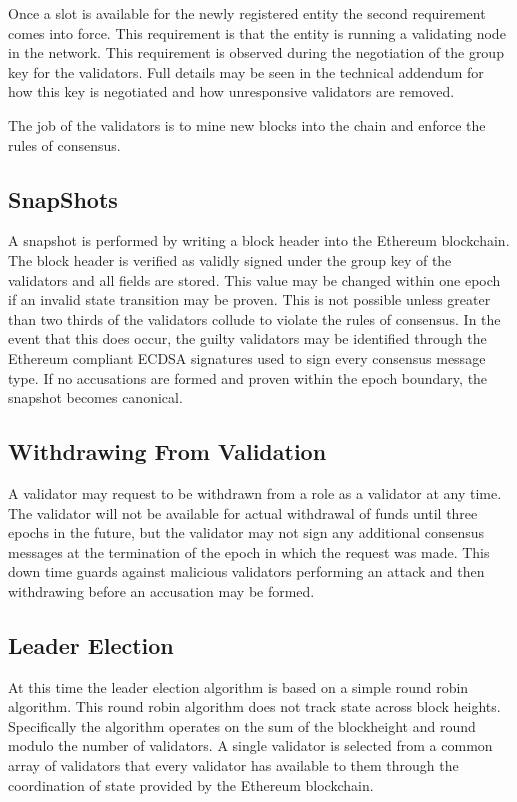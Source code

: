 Once a slot is available for the newly registered entity the second
requirement comes into force.
This requirement is that the entity is running a validating node in the
network.
This requirement is observed during the negotiation of the group key
for the validators.
Full details may be seen in the technical addendum for how this key is
negotiated and how unresponsive validators are removed.

The job of the validators is to mine new blocks into the chain and
enforce the rules of consensus.


\subsection{SnapShots}

A snapshot is performed by writing a block header into the Ethereum
blockchain.
The block header is verified as validly signed under the group key of
the validators and all fields are stored.
This value may be changed within one epoch if an invalid state
transition may be proven.
This is not possible unless greater than two thirds of the validators
collude to violate the rules of consensus.
In the event that this does occur, the guilty validators may be
identified through the Ethereum compliant \secp{} ECDSA signatures
used to sign every consensus message type.
If no accusations are formed and proven within the epoch boundary, the
snapshot becomes canonical.


\subsection{Withdrawing From Validation}

A validator may request to be withdrawn from a role as a validator at
any time.
The validator will not be available for actual withdrawal of funds
until three epochs in the future, but the validator may not sign any
additional consensus messages at the termination of the epoch in which
the request was made.
This down time guards against malicious validators performing an attack
and then withdrawing before an accusation may be formed.


\subsection{Leader Election}

At this time the leader election algorithm is based on a simple round
robin algorithm.
This round robin algorithm does not track state across block heights.
Specifically the algorithm operates on the sum of the blockheight and
round modulo the number of validators.
A single validator is selected from a common array of validators that
every validator has available to them through the coordination of state
provided by the Ethereum blockchain.


